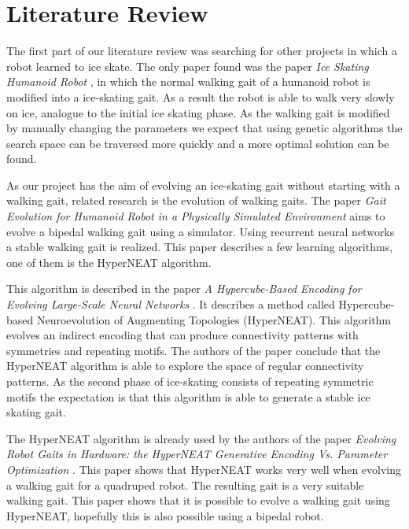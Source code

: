 \documentclass[10pt]{article}
\begin{document}
\section{Literature Review}
The first part of our literature review was searching for other projects in which a robot learned to ice skate. The only paper found was the paper \emph{Ice Skating Humanoid Robot} \cite{springerlink:10.1007/978-3-642-32527-4_19}, in which the normal walking gait of a humanoid robot is modified into a ice-skating gait. As a result the robot is able to walk very slowly on ice, analogue to the initial ice skating phase. As the walking gait is modified by manually changing the parameters we expect that using genetic algorithms the search space can be traversed more quickly and a more optimal solution can be found.

As our project has the aim of evolving an ice-skating gait without starting with a walking gait, related research is the evolution of walking gaits. The paper \emph{Gait Evolution for Humanoid Robot in a Physically Simulated Environment} \cite{springerlink:10.1007/978-3-642-22907-7_9} aims to evolve a bipedal walking gait using a simulator. Using recurrent neural networks a stable walking gait is realized. This paper describes a few learning algorithms, one of them is the HyperNEAT algorithm.

This algorithm is described in the paper \emph{A Hypercube-Based Encoding for Evolving Large-Scale Neural Networks} \cite{mitpress:hypercubebasedencoding}. It describes a method called Hypercube-based Neuroevolution of Augmenting Topologies (HyperNEAT). This algorithm evolves an indirect encoding that can produce connectivity patterns with symmetries and repeating motifs. The authors of the paper conclude that the HyperNEAT algorithm is able to explore the space of regular connectivity patterns. As the second phase of ice-skating consists of repeating symmetric motifs the expectation is that this algorithm is able to generate a stable ice skating gait.

The HyperNEAT algorithm is already used by the authors of the paper \emph{Evolving Robot Gaits in Hardware: the HyperNEAT Generative Encoding Vs. Parameter Optimization} \cite{Yosinski2011EvolvedGaits}. This paper shows that HyperNEAT works very well when evolving a walking gait for a quadruped robot. The resulting gait is a very suitable walking gait. This paper shows that it is possible to evolve a walking gait using HyperNEAT, hopefully this is also possible using a bipedal robot.
\end{document}
